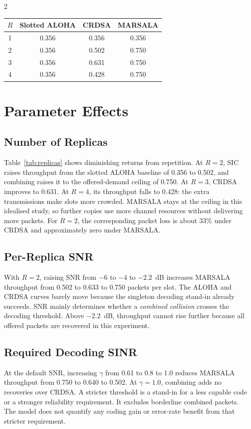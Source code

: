 \documentclass[a4paper,10pt]{article}
\begin{document}
\begin{multicols}{2}
\begin{center}
\begin{minipage}{\linewidth}
\label{tab:replicas}
\centering
\begin{tabular}{cccc}
\toprule
$R$ & Slotted ALOHA & CRDSA & MARSALA \\
\midrule
1 & 0.356 & 0.356 & 0.356 \\
2 & 0.356 & 0.502 & 0.750 \\
3 & 0.356 & 0.631 & 0.750 \\
4 & 0.356 & 0.428 & 0.750 \\
\bottomrule
\end{tabular}
\end{minipage}
\end{center}

\section{Parameter Effects}
\subsection{Number of Replicas}
Table~\ref{tab:replicas} shows diminishing returns from repetition. At
$R=2$, SIC raises throughput from the slotted ALOHA baseline of 0.356 to
0.502, and combining raises it to the offered-demand ceiling of 0.750. At
$R=3$, CRDSA improves to 0.631. At $R=4$, its throughput falls to 0.428:
the extra transmissions make slots more crowded. MARSALA stays at the
ceiling in this idealised study, so further copies use more channel resources
without delivering more packets. For $R=2$, the corresponding packet loss is
about 33\% under CRDSA and approximately zero under MARSALA.

\subsection{Per-Replica SNR}
With $R=2$, raising SNR from $-6$ to $-4$ to $-2.2$~dB increases MARSALA
throughput from 0.502 to 0.633 to 0.750 packets per slot. The ALOHA and
CRDSA curves barely move because the singleton decoding stand-in already
succeeds. SNR mainly determines whether a \emph{combined collision} crosses
the decoding threshold. Above $-2.2$~dB, throughput cannot rise further
because all offered packets are recovered in this experiment.

\subsection{Required Decoding SINR}
At the default SNR, increasing $\gamma$ from 0.61 to 0.8 to 1.0 reduces
MARSALA throughput from 0.750 to 0.640 to 0.502. At $\gamma=1.0$,
combining adds no recoveries over CRDSA. A stricter threshold is a stand-in
for a less capable code or a stronger reliability requirement. It excludes
borderline combined packets. The model does not quantify any coding gain or
error-rate benefit from that stricter requirement.


\end{multicols}
\end{document}
